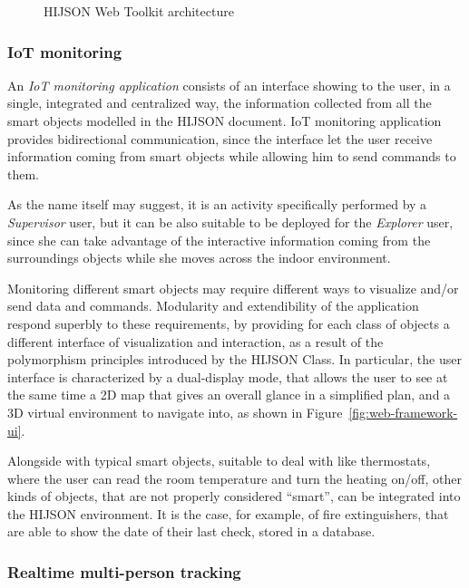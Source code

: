 \begin{figure*}[htb]
\centering
{}
\caption{HIJSON Web Toolkit architecture}
\label{fig:architecture}
\end{figure*}


\subsubsection{IoT monitoring}\label{iot-monitoring}

An \emph{IoT monitoring application} consists of an interface showing to the
user, in a single, integrated and centralized way, the information collected
from all the smart objects modelled in the HIJSON document. IoT monitoring
application provides bidirectional communication, since the interface let the
user receive information coming from smart objects while allowing him to send
commands to them.

As the name itself may suggest, it is an activity specifically performed by a
\emph{Supervisor} user, but it can be also suitable to be deployed for the
\emph{Explorer} user, since she can take advantage of the interactive
information coming from the surroundings objects while she moves across the
indoor environment.

Monitoring different smart objects may require different ways to visualize
and/or send data and commands. Modularity and extendibility of the application
respond superbly to these requirements, by providing for each class of objects
a different interface of visualization and interaction, as a result of the
polymorphism principles introduced by the HIJSON Class. In particular, the
user interface is characterized by a dual-display mode, that allows the user
to see at the same time a 2D map that gives an overall glance in a simplified
plan, and a 3D virtual environment to navigate into, as shown in
Figure~\ref{fig:web-framework-ui}.

Alongside with typical smart objects, suitable to deal with like thermostats,
where the user can read the room  temperature and turn the heating on/off,
other kinds of objects, that are not properly considered ``smart'', can be
integrated into the HIJSON environment. It is the case, for example, of fire
extinguishers, that are able to show the date of their last check, stored in a
database.

\subsubsection{Realtime multi-person tracking}\label{realtime-multi-person-tracking}

